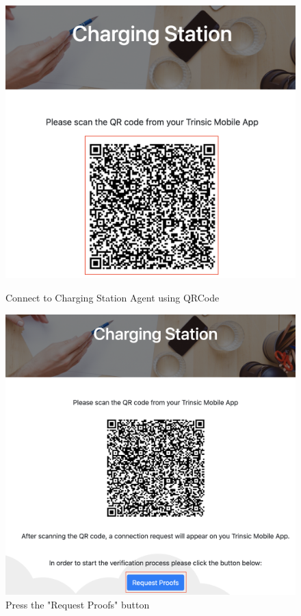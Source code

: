 \begin{figure}[H]
\centering
\begin{minipage}{.5\textwidth}
  \centering
  \includegraphics[width=.9\linewidth]{images/Frontend/Charging/1.1.png}
  \caption[]{Connect  to Charging Station Agent  using  QRCode}
  \label{fig:charging_screenshot_1.1}
\end{minipage}%
\begin{minipage}{.5\textwidth}
  \centering
  \includegraphics[width=.9\linewidth]{images/Frontend/Charging/2.png}
  \caption[]{Press the "Request Proofs" button}
  \label{fig:charging_screenshot_2}
\end{minipage}
\end{figure}

